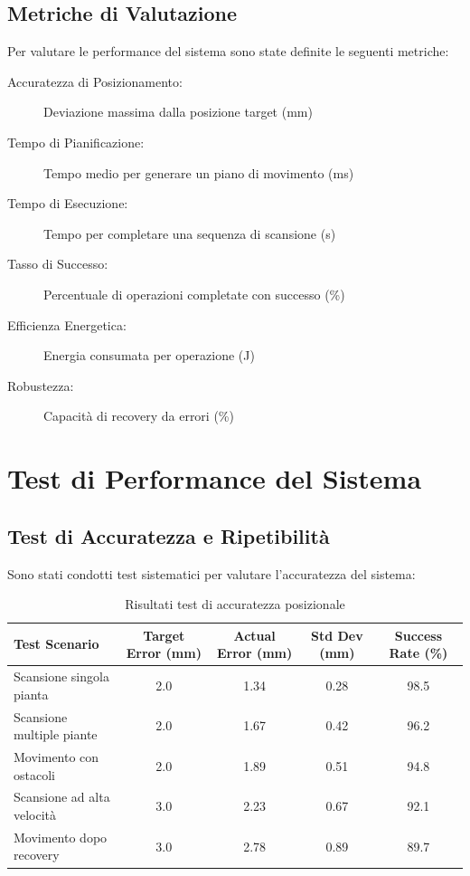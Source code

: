 \documentclass[12pt,a4paper,twoside,openright]{book}
\begin{document}
\subsection{Metriche di Valutazione}

Per valutare le performance del sistema sono state definite le seguenti metriche:

\begin{description}
    \item[Accuratezza di Posizionamento:] Deviazione massima dalla posizione target (mm)
    \item[Tempo di Pianificazione:] Tempo medio per generare un piano di movimento (ms)
    \item[Tempo di Esecuzione:] Tempo per completare una sequenza di scansione (s)
    \item[Tasso di Successo:] Percentuale di operazioni completate con successo (\%)
    \item[Efficienza Energetica:] Energia consumata per operazione (J)
    \item[Robustezza:] Capacità di recovery da errori (\%)
\end{description}

\section{Test di Performance del Sistema}

\subsection{Test di Accuratezza e Ripetibilità}

Sono stati condotti test sistematici per valutare l'accuratezza del sistema:

\begin{table}[H]
\centering
\caption{Risultati test di accuratezza posizionale}
\label{tab:accuracy_results}
\begin{tabular}{@{}lcccc@{}}
\toprule
\textbf{Test Scenario} & \textbf{Target Error (mm)} & \textbf{Actual Error (mm)} & \textbf{Std Dev (mm)} & \textbf{Success Rate (\%)} \\
\midrule
Scansione singola pianta & 2.0 & 1.34 & 0.28 & 98.5 \\
Scansione multiple piante & 2.0 & 1.67 & 0.42 & 96.2 \\
Movimento con ostacoli & 2.0 & 1.89 & 0.51 & 94.8 \\
Scansione ad alta velocità & 3.0 & 2.23 & 0.67 & 92.1 \\
Movimento dopo recovery & 3.0 & 2.78 & 0.89 & 89.7 \\
\bottomrule
\end{tabular}
\end{table}
\end{document}
